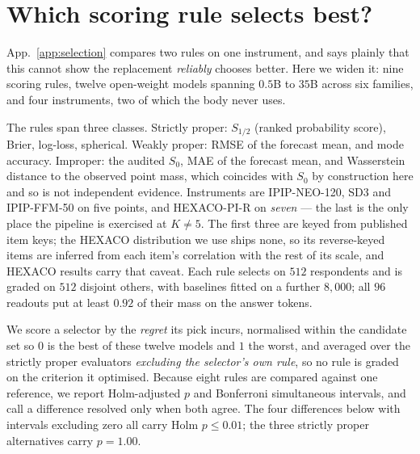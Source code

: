 \documentclass[11pt]{article}
\begin{document}
\section{Which scoring rule selects best?}
\label{app:rules}

App.~\ref{app:selection} compares two rules on one instrument, and says plainly
that this cannot show the replacement \emph{reliably} chooses better. Here we
widen it: nine scoring rules, twelve open-weight models spanning $0.5$B to
$35$B across six families, and four instruments, two of which the body never
uses.

The rules span three classes. Strictly proper: $S_{1/2}$ (ranked probability
score), Brier, log-loss, spherical. Weakly proper: RMSE of the forecast mean,
and mode accuracy. Improper: the audited $S_0$, MAE of the forecast mean, and
Wasserstein distance to the observed point mass, which coincides with $S_0$ by
construction here and so is not independent evidence. Instruments are IPIP-NEO-120,
SD3 and IPIP-FFM-50 on five points, and HEXACO-PI-R on \emph{seven} --- the
last is the only place the pipeline is exercised at $K\neq5$. The first three
are keyed from published item keys; the HEXACO distribution we use ships none,
so its reverse-keyed items are inferred from each item's correlation with the
rest of its scale, and HEXACO results carry that caveat. Each rule selects on
$512$ respondents and is graded on $512$ disjoint others, with baselines fitted
on a further $8{,}000$; all $96$ readouts put at least $0.92$ of their mass on
the answer tokens.

We score a selector by the \emph{regret} its pick incurs, normalised within the
candidate set so $0$ is the best of these twelve models and $1$ the worst, and
averaged over the strictly proper evaluators \emph{excluding the selector's own
rule}, so no rule is graded on the criterion it optimised. Because eight rules
are compared against one reference, we report Holm-adjusted $p$ and Bonferroni
simultaneous intervals, and call a difference resolved only when both agree.
The four differences below with intervals excluding zero all carry Holm
$p\le0.01$; the three strictly proper alternatives carry $p=1.00$.
\end{document}
